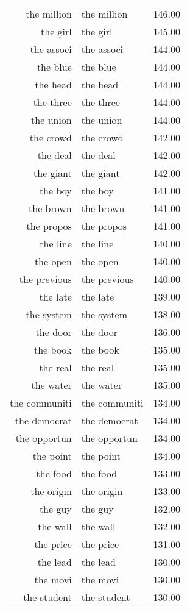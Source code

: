 \begin{table}[ht]
\begin{tabular}{rlr}
  the million & the million & 146.00 \\ 
  the girl & the girl & 145.00 \\ 
  the associ & the associ & 144.00 \\ 
  the blue & the blue & 144.00 \\ 
  the head & the head & 144.00 \\ 
  the three & the three & 144.00 \\ 
  the union & the union & 144.00 \\ 
  the crowd & the crowd & 142.00 \\ 
  the deal & the deal & 142.00 \\ 
  the giant & the giant & 142.00 \\ 
  the boy & the boy & 141.00 \\ 
  the brown & the brown & 141.00 \\ 
  the propos & the propos & 141.00 \\ 
  the line & the line & 140.00 \\ 
  the open & the open & 140.00 \\ 
  the previous & the previous & 140.00 \\ 
  the late & the late & 139.00 \\ 
  the system & the system & 138.00 \\ 
  the door & the door & 136.00 \\ 
  the book & the book & 135.00 \\ 
  the real & the real & 135.00 \\ 
  the water & the water & 135.00 \\ 
  the communiti & the communiti & 134.00 \\ 
  the democrat & the democrat & 134.00 \\ 
  the opportun & the opportun & 134.00 \\ 
  the point & the point & 134.00 \\ 
  the food & the food & 133.00 \\ 
  the origin & the origin & 133.00 \\ 
  the guy & the guy & 132.00 \\ 
  the wall & the wall & 132.00 \\ 
  the price & the price & 131.00 \\ 
  the lead & the lead & 130.00 \\ 
  the movi & the movi & 130.00 \\ 
  the student & the student & 130.00 \\ 

\end{tabular}
\end{table}
